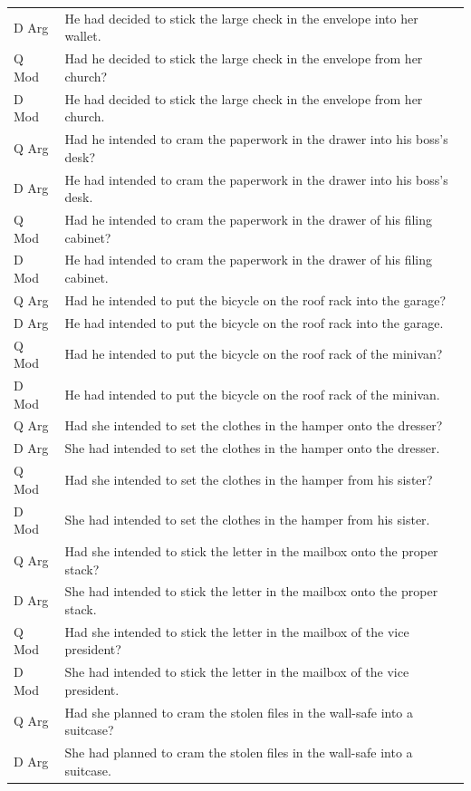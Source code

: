 \documentclass[12pt,oneside]{book}
\begin{document}
\begin{longtable}{ll}
D Arg & He had decided to stick the large check in the envelope into her wallet.\\
Q Mod & Had he decided to stick the large check in the envelope from her church?\\
D Mod & He had decided to stick the large check in the envelope from her church.\\
\addlinespace
Q Arg & Had he intended to cram the paperwork in the drawer into his boss's desk?\\
D Arg & He had intended to cram the paperwork in the drawer into his boss's desk.\\
Q Mod & Had he intended to cram the paperwork in the drawer of his filing cabinet?\\
D Mod & He had intended to cram the paperwork in the drawer of his filing cabinet.\\
\addlinespace
Q Arg & Had he intended to put the bicycle on the roof rack into the garage?\\
D Arg & He had intended to put the bicycle on the roof rack into the garage.\\
Q Mod & Had he intended to put the bicycle on the roof rack of the minivan?\\
D Mod & He had intended to put the bicycle on the roof rack of the minivan.\\
\addlinespace
Q Arg & Had she intended to set the clothes in the hamper onto the dresser?\\
D Arg & She had intended to set the clothes in the hamper onto the dresser.\\
Q Mod & Had she intended to set the clothes in the hamper from his sister?\\
D Mod & She had intended to set the clothes in the hamper from his sister.\\
\addlinespace
Q Arg & Had she intended to stick the letter in the mailbox onto the proper stack?\\
D Arg & She had intended to stick the letter in the mailbox onto the proper stack.\\
Q Mod & Had she intended to stick the letter in the mailbox of the vice president?\\
D Mod & She had intended to stick the letter in the mailbox of the vice president.\\
\addlinespace
Q Arg & Had she planned to cram the stolen files in the wall-safe into a suitcase?\\
D Arg & She had planned to cram the stolen files in the wall-safe into a suitcase.\\

\end{longtable}
\end{document}
